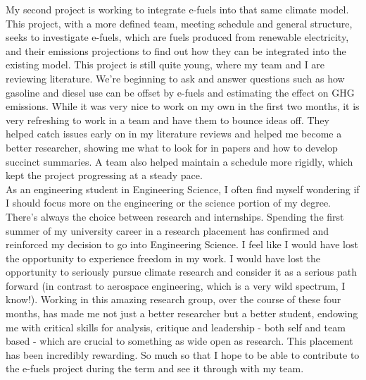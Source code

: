 \documentclass{article}
\begin{document}
My second project is working to integrate e-fuels into that same climate model. This project, with a more defined team, meeting schedule and general structure, seeks to investigate e-fuels, which are fuels produced from renewable electricity, and their emissions projections to find out how they can be integrated into the existing model. This project is still quite young, where my team and I are reviewing literature. We're beginning to ask and answer questions such as how gasoline and diesel use can be offset by e-fuels and estimating the effect on GHG emissions. While it was very nice to work on my own in the first two months, it is very refreshing to work in a team and have them to bounce ideas off. They helped catch issues early on in my literature reviews and helped me become a better researcher, showing me what to look for in papers and how to develop succinct summaries. A team also helped maintain a schedule more rigidly, which kept the project progressing at a steady pace.\\

As an engineering student in Engineering Science, I often find myself wondering if I should focus more on the engineering or the science portion of my degree. There's always the choice between research and internships. Spending the first summer of my university career in a research placement has confirmed and reinforced my decision to go into Engineering Science. I feel like I would have lost the opportunity to experience freedom in my work. I would have lost the opportunity to seriously pursue climate research and consider it as a serious path forward (in contrast to aerospace engineering, which is a very wild spectrum, I know!). Working in this amazing research group, over the course of these four months, has made me not just a better researcher but a better student, endowing me with critical skills for analysis, critique and leadership - both self and team based - which are crucial to something as wide open as research. This placement has been incredibly rewarding. So much so that I hope to be able to contribute to the e-fuels project during the term and see it through with my team. 
\end{document}
